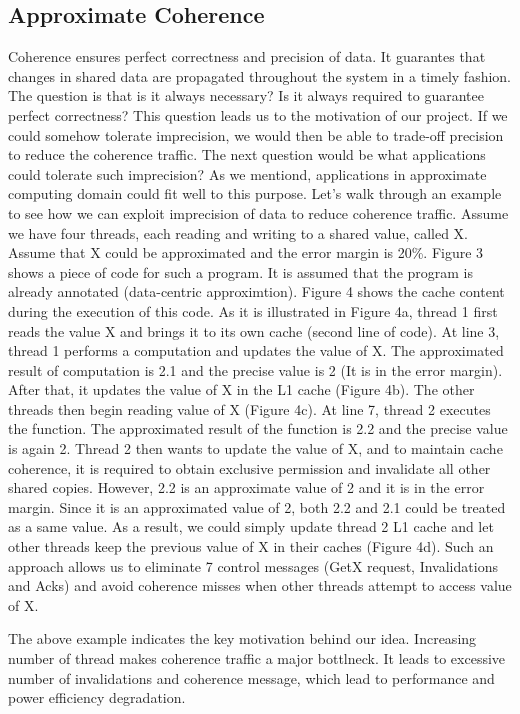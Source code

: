 


\subsection{Approximate Coherence}

Coherence ensures perfect correctness and precision of data. It guarantes that changes in shared data are propagated throughout the system in a timely fashion. The question is that is it always necessary? Is it always required to guarantee perfect correctness? This question leads us to the motivation of our project. If we could somehow tolerate imprecision, we would then be able to trade-off precision to reduce the coherence traffic. The next question would be what applications could tolerate such imprecision? As we mentiond, applications in approximate computing domain could fit well to this purpose. Let's walk through an example to see how we can exploit imprecision of data to reduce coherence traffic. Assume we have four threads, each reading and writing to a shared value, called X. Assume that X could be approximated and the error margin is 20\%. Figure 3 shows a piece of code for such a program. It is assumed that the program is already annotated (data-centric approximtion). Figure 4 shows the cache content during the execution of this code. As it is illustrated in Figure 4a, thread 1 first reads the value X and brings it to its own cache (second line of code). At line 3, thread 1 performs a computation and updates the value of X. The approximated result of computation is 2.1 and the precise value is 2 (It is in the error margin). After that, it updates the value of X in the L1 cache (Figure 4b). The other threads then begin reading value of X (Figure 4c). At line 7, thread 2 executes the function. The approximated result of the function is 2.2 and the precise value is again 2. Thread 2 then wants to update the value of X, and to maintain cache coherence, it is required to obtain exclusive permission and invalidate all other shared copies. However, 2.2 is an approximate value of 2 and it is in the error margin. Since it is an approximated value of 2, both 2.2 and 2.1 could be treated as a same value. As a result, we could simply update thread 2 L1 cache and let other threads keep the previous value of X in their caches (Figure 4d). Such an approach allows us to eliminate 7 control messages (GetX request, Invalidations and Acks) and avoid coherence misses when other threads attempt to access value of X. 

The above example indicates the key motivation behind our idea. Increasing number of thread makes coherence traffic a major bottlneck. It leads to excessive number of invalidations and coherence message, which lead to performance and power efficiency degradation.
  





